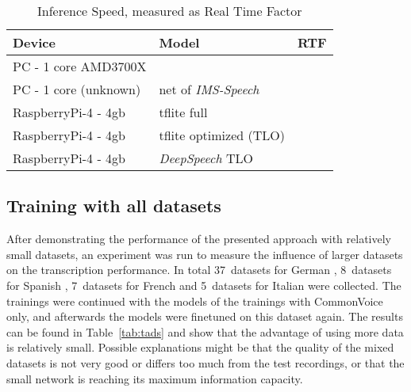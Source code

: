 \documentclass[a4paper]{article}
\begin{document}
\begin{table}[H]
	\caption{Inference Speed, measured as Real Time Factor}
	\label{tab:insp}
	\centering
	\begin{tabular}{llc}
		\toprule
		\textbf{Device} & \textbf{Model} & \textbf{RTF} \\
		\midrule
		PC - 1 core AMD3700X &  &  \\
		PC - 1 core (unknown) & net of \textit{IMS-Speech} \cite{IMSDE} &  \\
		\midrule
		RaspberryPi-4 - 4gb & tflite full &  \\
		RaspberryPi-4 - 4gb & tflite optimized (TLO) &  \\
		RaspberryPi-4 - 4gb & \textit{DeepSpeech} TLO &  \\
		\bottomrule
	\end{tabular}
\end{table}

\subsection{Training with all datasets}

After demonstrating the performance of the presented approach with relatively small datasets, an experiment was run to measure the influence of larger datasets on the transcription performance.
In total 37~datasets for German \cite{VOXF,TUDA,COMV,FRMT,SPRIN,CSS10,GOTH,KURZG,LINGL,MUWI,MALBS,PULSR,SWC,TATO,TERAX,YKOLL,ZAMSP,ALC,BROTH,HMPL,PHATT,PD1,RVG1,RVGJ,SC10,SHC,SI100,SMC,VM1,VM2,WASEP,ZIPTEL,TORST,GLD2,SKYRM,WIT3,MTEDX}, 8~datasets for Spanish \cite{VOXF,COMV,CSS10,LINGL,MALBS,TATO,MTEDX,LVES}, 7~datasets for French \cite{VOXF,COMV,CSS10,LINGL,MALBS,TATO,MTEDX} and 5~datasets for Italian \cite{VOXF,COMV,LINGL,MALBS,MTEDX} were collected. The trainings were continued with the models of the trainings with CommonVoice only, and afterwards the models were finetuned on this dataset again. The results can be found in Table~\ref{tab:tads} and show that the advantage of using more data is relatively small. Possible explanations might be that the quality of the mixed datasets is not very good or differs too much from the test recordings, or that the small network is reaching its maximum information capacity.
\end{document}
